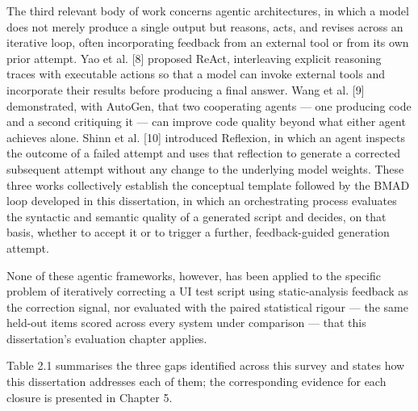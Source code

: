The third relevant body of work concerns agentic architectures, in which
a model does not merely produce a single output but reasons, acts, and
revises across an iterative loop, often incorporating feedback from an
external tool or from its own prior attempt. Yao et al. {[}8{]} proposed
ReAct, interleaving explicit reasoning traces with executable actions so
that a model can invoke external tools and incorporate their results
before producing a final answer. Wang et al. {[}9{]} demonstrated, with
AutoGen, that two cooperating agents --- one producing code and a second
critiquing it --- can improve code quality beyond what either agent
achieves alone. Shinn et al. {[}10{]} introduced Reflexion, in which an
agent inspects the outcome of a failed attempt and uses that reflection
to generate a corrected subsequent attempt without any change to the
underlying model weights. These three works collectively establish the
conceptual template followed by the BMAD loop developed in this
dissertation, in which an orchestrating process evaluates the syntactic
and semantic quality of a generated script and decides, on that basis,
whether to accept it or to trigger a further, feedback-guided generation
attempt.

None of these agentic frameworks, however, has been applied to the
specific problem of iteratively correcting a UI test script using
static-analysis feedback as the correction signal, nor evaluated with
the paired statistical rigour --- the same held-out items scored across
every system under comparison --- that this dissertation's evaluation
chapter applies.

Table 2.1 summarises the three gaps identified across this survey and
states how this dissertation addresses each of them; the corresponding
evidence for each closure is presented in Chapter 5.

